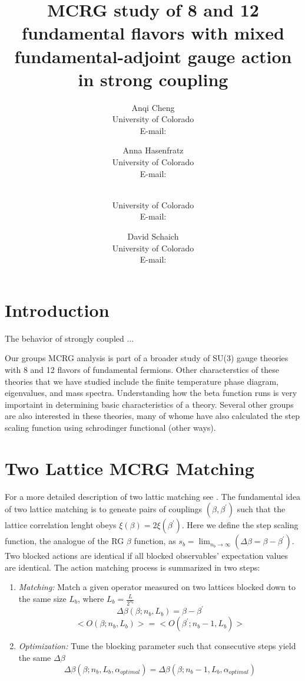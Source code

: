 \documentclass{PoS}
\title{MCRG study of 8 and 12 fundamental flavors with mixed fundamental-adjoint gauge action in strong coupling}
\author{Anqi Cheng\\
        University of Colorado\\
        E-mail: \email{chenganqi498@gmail.com}}
\author{Anna Hasenfratz\\
        University of Colorado\\
        E-mail: \email{anna@eotvos.colorado.edu}}
\author{\speaker{Gregory Petropoulos}\\
        University of Colorado\\
        E-mail: \email{gregory.petropoulos@colorado.edu}}
\author{David Schaich\\
        University of Colorado\\
        E-mail: \email{daschaich@gmail.com}}
\begin{document}
\section{Introduction}
The behavior of strongly coupled ...

Our groups MCRG analysis is part of a broader study of SU(3) gauge theories with 8 and 12 flavors of fundamental fermions.  Other characterstics of these theories that we have studied include the finite temperature phase diagram, eigenvalues, and mass spectra.  Understanding how the beta function runs is very importaint in determining basic characteristics of a theory.  Several other groups are also interested in these theories, many of whome have also calculated the step scaling function using schrodinger functional (other ways).  

\section{Two Lattice MCRG Matching}
For a more detailed description of two lattic matching see \cite{annaMCRG}.  The fundamental idea of two lattice matching is to geneate pairs of couplings $(\beta, \beta^{\prime})$ such that the lattice correlation lenght obeys $\xi(\beta)=2\xi(\beta^{\prime})$.  Here we define the step scaling function, the analogue of the RG $\beta$ function, as $s_b= \lim_{n_b\to\infty}(\Delta\beta=\beta − \beta^{\prime})$.  Two blocked actions are identical if all blocked observables' expectation values are identical.  The action matching process is summarized in two steps:

\begin{enumerate}
\item \emph{Matching:}  Match a given operator measured on two lattices blocked down to the same size $L_b$, where $L_b=\frac{L}{2^{n_b}}$
\begin{equation}
\Delta\beta(\beta;n_b,L_b)=\beta-\beta^{\prime}
\end{equation}
\begin{equation}
<O(\beta;n_b,L_b)>=<O(\beta^{\prime};n_b-1,L_b)>
\end{equation}
\item \emph{Optimization:}  Tune the blocking parameter such that consecutive steps yield the same $\Delta\beta$
\begin{equation}
\Delta\beta(\beta;n_b,L_b,\alpha_{optimal})=\Delta\beta(\beta;n_b-1,L_b,\alpha_{optimal})
\end{equation}
\end{enumerate}
\end{document}
